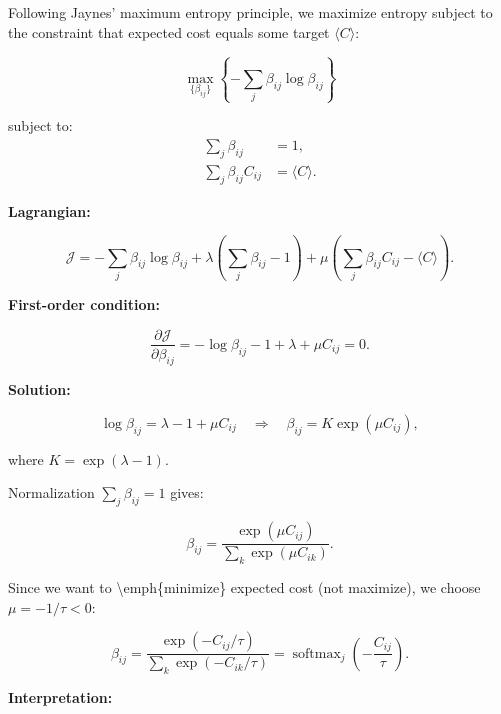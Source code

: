 \documentclass[11pt]{article}
\begin{document}
Following Jaynes' maximum entropy principle, we maximize entropy subject to the constraint that expected cost equals some target $\langle C \rangle$:

\begin{equation}
\max_{\{\beta_{ij}\}} \left\{-\sum_j \beta_{ij}\log\beta_{ij}\right\}
\end{equation}

subject to:\\
\begin{align}
\sum_j \beta_{ij} &= 1, \\
\sum_j \beta_{ij} C_{ij} &= \langle C \rangle.
\end{align}

\textbf{Lagrangian:}

\begin{equation}
\mathcal{J} = -\sum_j \beta_{ij}\log\beta_{ij} + \lambda\left(\sum_j \beta_{ij} - 1\right) + \mu\left(\sum_j \beta_{ij} C_{ij} - \langle C \rangle\right).
\end{equation}

\textbf{First-order condition:}

\begin{equation}
\frac{\partial \mathcal{J}}{\partial \beta_{ij}} = -\log\beta_{ij} - 1 + \lambda + \mu C_{ij} = 0.
\end{equation}

\textbf{Solution:}

\begin{equation}
\log\beta_{ij} = \lambda - 1 + \mu C_{ij}
\quad \Rightarrow \quad
\beta_{ij} = K \exp(\mu C_{ij}),
\end{equation}

where $K = \exp(\lambda - 1)$.

Normalization $\sum_j \beta_{ij} = 1$ gives:

\begin{equation}
\beta_{ij} = \frac{\exp(\mu C_{ij})}{\sum_k \exp(\mu C_{ik})}.
\end{equation}

Since we want to \textbackslash emph\{minimize\} expected cost (not maximize), we choose $\mu = -1/\tau < 0$:

\begin{equation}
\boxed{\beta_{ij} = \frac{\exp(-C_{ij}/\tau)}{\sum_k \exp(-C_{ik}/\tau)} = \operatorname{softmax}_j\left(-\frac{C_{ij}}{\tau}\right)}.
\end{equation}

\textbf{Interpretation:}
\end{document}
